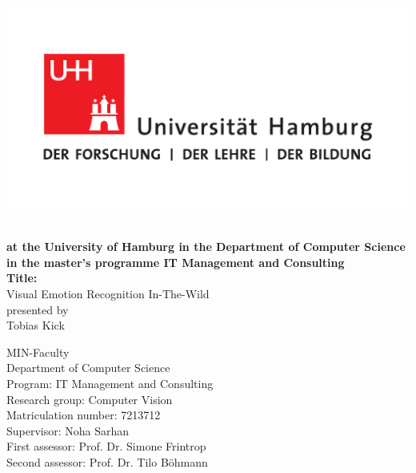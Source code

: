 \documentclass[11pt,a4paper]{scrbook}
\begin{document}
\frontmatter  %
\begin{titlepage}
\includegraphics[scale=0.3]{UHH-Logo_2010_Farbe_CMYK.pdf}
\vspace*{2.0cm}
\Large
\begin{center}
{\color{uhhred}\textbf{}}
\vspace*{1.0cm}\\
{\textbf{at the University of Hamburg in the Department of Computer Science in the master's programme IT Management and Consulting}}
\vspace*{2.0cm}\\
{\LARGE \textbf{Title:}}
\vspace*{0.4cm}\\
{\LARGE Visual Emotion Recognition In-The-Wild}
\vspace*{1.5cm}\\
presented by
\vspace*{0.4cm}\\
Tobias Kick
\end{center}
\vspace*{2.0cm}

\noindent
MIN-Faculty \vspace*{0.25cm} \\
Department of Computer Science\vspace*{0.25cm} \\
Program: IT Management and Consulting\vspace*{0.25cm} \\
Research group: Computer Vision\vspace*{0.25cm} \\
Matriculation number: 7213712 \vspace*{0.5cm} \\
Supervisor: Noha Sarhan \vspace*{0.25cm} \\
First assessor: Prof. Dr. Simone Frintrop \vspace*{0.25cm} \\
Second assessor: Prof. Dr. Tilo Böhmann


\end{titlepage}
\end{document}
